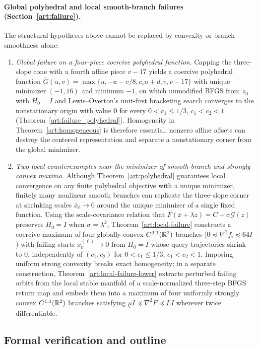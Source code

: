 \paragraph{Global polyhedral and local smooth-branch failures (Section~\ref{art:failure}).}
The structural hypotheses above cannot be replaced by convexity or branch
smoothness alone:
\begin{enumerate}
\item \emph{Global failure on a four-piece coercive polyhedral function.}
Capping the three-slope cone with a fourth affine piece $v-17$ yields a coercive
polyhedral function $\overline G(u,v)=\max\{u,-u-v/8,c_\circ u+d_\circ v,v-17\}$
with unique minimizer $(-1,16)$ and minimum $-1$, on which unmodified BFGS from
$z_0$ with $H_0=I$ and Lewis--Overton's unit-first bracketing search converges
to the nonstationary origin with value $0$ for every $0<c_1\le1/3$, $c_1<c_2<1$
(Theorem~\ref{art:failure_polyhedral}). Homogeneity in
Theorem~\ref{art:homogeneous} is therefore essential: nonzero affine offsets can
destroy the centered representation and separate a nonstationary corner from
the global minimizer.
\item \emph{Two local counterexamples near the minimizer of smooth-branch and
strongly convex maxima.}
Although Theorem~\ref{art:polyhedral} guarantees local convergence on any finite
polyhedral objective with a unique minimizer, finitely many nonlinear smooth
branches can replicate the
three-slope corner at shrinking scales $\bar x_\ell\to0$ around the unique
minimizer of a single fixed function. Using the scale-covariance relation that
$F(\bar x+\lambda z)=C+\sigma\mathcal G(z)$ preserves $H_0=I$ when
$\sigma=\lambda^2$, Theorem~\ref{art:local-failure} constructs a coercive
maximum of four globally convex $C^{2,1}(\mathbb R^2)$ branches ($0\preceq\nabla^2f_i\preceq64I$)
with failing starts $x_0^{(\ell)}\to0$ from $H_0=I$ whose query trajectories
shrink to $0$, independently of $(c_1,c_2)$ for $0<c_1\le1/3$, $c_1<c_2<1$.
Imposing uniform strong convexity breaks exact homogeneity; in a separate
construction, Theorem~\ref{art:local-failure-lower} extracts perturbed failing
orbits from the local stable manifold of a scale-normalized three-step BFGS
return map and embeds them into a maximum of four uniformly strongly convex
$C^{1,1}(\mathbb R^2)$ branches satisfying $\underline\mu I\preceq\nabla^2F\preceq\overline L I$
wherever twice differentiable.
\end{enumerate}

\subsection{Formal verification and outline}

